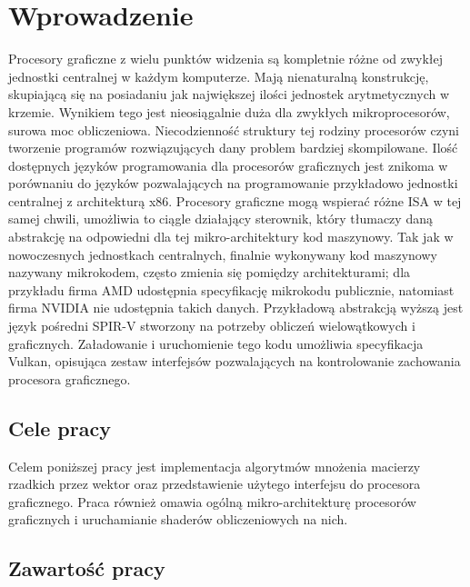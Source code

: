 \chapter{Wprowadzenie}
\label{cha:wprowadzenie}

Procesory graficzne z wielu punktów widzenia są kompletnie różne od zwykłej jednostki centralnej w każdym komputerze.
Mają nienaturalną konstrukcję, skupiającą się na posiadaniu jak największej ilości jednostek arytmetycznych w krzemie.
Wynikiem tego jest nieosiągalnie duża dla zwykłych mikroprocesorów, surowa moc obliczeniowa.
Niecodzienność struktury tej rodziny procesorów czyni tworzenie programów rozwiązujących dany problem bardziej skompilowane.
Ilość dostępnych języków programowania dla procesorów graficznych jest znikoma w porównaniu do języków pozwalających na programowanie przykładowo jednostki centralnej z architekturą x86.
Procesory graficzne mogą wspierać różne ISA w tej samej chwili, umożliwia to ciągle działający sterownik, który tłumaczy daną abstrakcję na odpowiedni dla tej mikro-architektury kod maszynowy.
Tak jak w nowoczesnych jednostkach centralnych, finalnie wykonywany kod maszynowy nazywany mikrokodem, często zmienia się pomiędzy architekturami; dla przykładu firma AMD udostępnia specyfikację mikrokodu publicznie\cite{AMDISA}, natomiast firma NVIDIA nie udostępnia takich danych. 
Przykładową abstrakcją wyższą jest język pośredni SPIR-V stworzony na potrzeby obliczeń wielowątkowych i graficznych.
Załadowanie i uruchomienie tego kodu umożliwia specyfikacja Vulkan, opisująca zestaw interfejsów pozwalających na kontrolowanie zachowania procesora graficznego.


\section{Cele pracy}
\label{sec:celePracy}

Celem poniższej pracy jest implementacja algorytmów mnożenia macierzy rzadkich przez wektor oraz przedstawienie użytego interfejsu do procesora graficznego. Praca również omawia ogólną mikro-architekturę procesorów graficznych i uruchamianie shaderów obliczeniowych na nich.


\section{Zawartość pracy}
\label{sec:zawartoscPracy}

